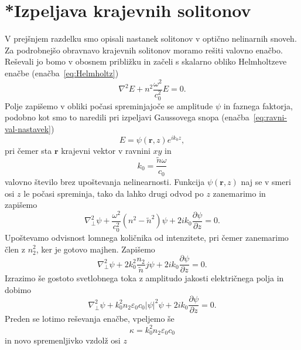 \section{*Izpeljava krajevnih solitonov}
\label{chap:ks}
V prejšnjem razdelku smo opisali nastanek solitonov v optično nelinarnih snoveh. 
Za podrobnejšo obravnavo krajevnih solitonov moramo rešiti valovno 
enačbo. Reševali jo bomo v obosnem približku in začeli s skalarno obliko Helmholtzeve enačbe (enačba~\ref{eq:Helmholtz})
\begin{equation}
\nabla^{2}E+n^{2}\frac{\omega^{2}}{c_0^{2}}E=0.
\label{8.80}
\end{equation}
Polje zapišemo v obliki počasi spreminjajoče se amplitude $\psi$ in faznega faktorja, podobno kot 
smo to naredili pri izpeljavi Gaussovega snopa (enačba~\ref{eq:ravni-val-nastavek})
\begin{equation}
E=\psi(\mathbf{r},z)e^{ik_{0}z},
\label{8.81}
\end{equation}
pri čemer sta $\mathbf{r}$ krajevni vektor v ravnini $xy$ in 
\begin{equation}
k_{0}=\frac{\tilde{n}\omega}{c_0} 
\end{equation}
valovno število brez upoštevanja nelinearnosti.
Funkcija $\psi(\mathbf{r},z)$ naj se v smeri osi $z$ le počasi spreminja, tako da lahko
drugi odvod po $z$ zanemarimo in zapišemo 
\begin{equation}
\nabla_{\bot}^{2}\psi+\frac{\omega^{2}}{c_0^{2}}(n^{2}-\tilde{n}^{2})\psi+2ik_{0}
\frac{\partial\psi}{\partial z}=0.
\label{8.82}
\end{equation}
Upoštevamo odvisnost lomnega količnika od intenzitete, pri čemer
zanemarimo člen z $n_{2}^{2}$, ker je gotovo majhen. Zapišemo
\begin{equation}
\nabla_{\bot}^{2}\psi+2k_{0}^{2}\frac{n_{2}}{\tilde{n}}j\psi+2ik_{0}\frac{\partial\psi}{\partial z}=0.
\label{8.83}
\end{equation}
Izrazimo še gostoto svetlobnega toka z amplitudo jakosti električnega polja in dobimo
\begin{equation}
\nabla_{\bot}^{2}\psi+
k_{0}^{2} n_2 \varepsilon_0 c_0 |\psi|^2 \psi+
2ik_{0}\frac{\partial\psi}{\partial z}=0.
\label{8.83a}
\end{equation}
Preden se lotimo reševanja enačbe, vpeljemo še
\begin{equation}
\kappa=k_{0}^{2} n_2 \varepsilon_0 c_0
\end{equation}
 in novo spremenljivko vzdolž osi $z$
